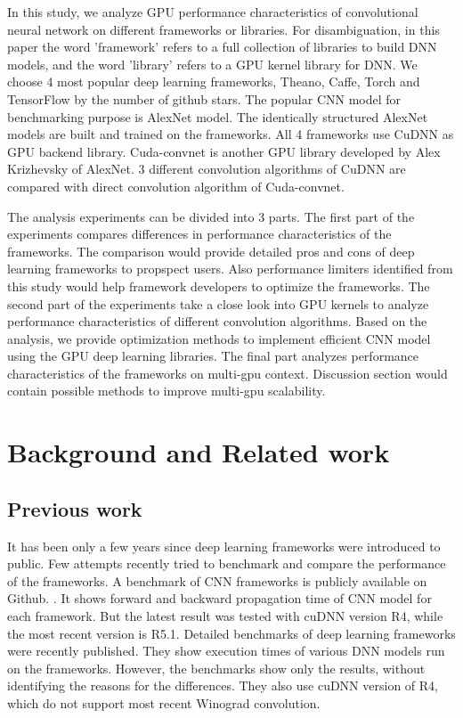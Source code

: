 \documentclass[conference]{IEEEtran}
\begin{document}
In this study, we analyze GPU performance characteristics of convolutional neural network on different frameworks or libraries.
For disambiguation, in this paper the word 'framework' refers to a full collection of libraries to build DNN models, and the word 'library' refers to a GPU kernel library for DNN.
We choose 4 most popular deep learning frameworks, Theano, Caffe, Torch and TensorFlow by the number of github stars.
The popular CNN model for benchmarking purpose is AlexNet model.
\cite{krizhevsky2012imagenet}
The identically structured AlexNet models are built and trained on the frameworks.
All 4 frameworks use CuDNN as GPU backend library.
Cuda-convnet is another GPU library developed by Alex Krizhevsky of AlexNet.
\cite{cuda-convnet}
3 different convolution algorithms of CuDNN are compared with direct convolution algorithm of Cuda-convnet.

The analysis experiments can be divided into 3 parts.
The first part of the experiments compares differences in performance characteristics of the frameworks.
The comparison would provide detailed pros and cons of deep learning frameworks to propspect users.
Also performance limiters identified from this study would help framework developers to optimize the frameworks.
The second part of the experiments take a close look into GPU kernels to analyze performance characteristics of different convolution algorithms.
Based on the analysis, we provide optimization methods to implement efficient CNN model using the GPU deep learning libraries.
The final part analyzes performance characteristics of the frameworks on multi-gpu context.
Discussion section would contain possible methods to improve multi-gpu scalability.

\section{Background and Related work}

\subsection{Previous work}
It has been only a few years since deep learning frameworks were introduced to public.
Few attempts recently tried to benchmark and compare the performance of the frameworks.
A benchmark of CNN frameworks is publicly available on Github.
\cite{convnet-benchmarks}.
It shows forward and backward propagation time of CNN model for each framework.
But the latest result was tested with cuDNN version R4, while the most recent version is R5.1.
Detailed benchmarks of deep learning frameworks were recently published.
\cite{DBLP:journals/corr/BahrampourRSS15, DBLP:journals/corr/ShiWXC16}
They show execution times of various DNN models run on the frameworks.
However, the benchmarks show only the results, without identifying the reasons for the differences.
They also use cuDNN version of R4, which do not support most recent Winograd convolution.
\end{document}
